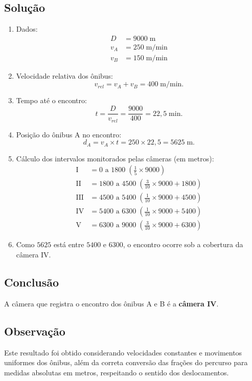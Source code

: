 \documentclass{article}
\begin{document}
\subsection*{Solução}
\begin{enumerate}
  \item Dados:
  \begin{align*}
    D &= 9000 \; \mathrm{m} \\
    v_A &= 250 \; \mathrm{m/min} \\
    v_B &= 150 \; \mathrm{m/min}
  \end{align*}
  \item Velocidade relativa dos ônibus:
  \[
  v_{rel} = v_A + v_B = 400 \; \mathrm{m/min}.
  \]
  \item Tempo até o encontro:
  \[
  t = \frac{D}{v_{rel}} = \frac{9000}{400} = 22,5 \; \mathrm{min}.
  \]
  \item Posição do ônibus A no encontro:
  \[
  d_A = v_A \times t = 250 \times 22,5 = 5625 \; \mathrm{m}.
  \]
  \item Cálculo dos intervalos monitorados pelas câmeras (em metros):
  \begin{align*}
    \text{I} &= 0 \text{ a } 1800 \; (\frac{1}{5} \times 9000) \\
    \text{II} &= 1800 \text{ a } 4500 \; (\frac{3}{10} \times 9000 + 1800) \\
    \text{III} &= 4500 \text{ a } 5400 \; (\frac{1}{10} \times 9000 + 4500) \\
    \text{IV} &= 5400 \text{ a } 6300 \; (\frac{1}{10} \times 9000 + 5400) \\
    \text{V} &= 6300 \text{ a } 9000 \; (\frac{3}{10} \times 9000 + 6300)
  \end{align*}
  \item Como $5625$ está entre $5400$ e $6300$, o encontro ocorre sob a cobertura da câmera IV.
\end{enumerate}

\subsection*{Conclusão}
A câmera que registra o encontro dos ônibus A e B é a \textbf{câmera IV}.

\subsection*{Observação}
Este resultado foi obtido considerando velocidades constantes e movimentos uniformes dos ônibus, além da correta conversão das frações do percurso para medidas absolutas em metros, respeitando o sentido dos deslocamentos.
\end{document}
